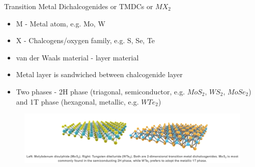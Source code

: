 \documentclass{beamer}
\begin{document}
\begin{frame}{Transition Metal Dichalcogenides or TMDCs or $MX_2$}
\begin{itemize}
    \item M - Metal atom, e.g. Mo, W
    \item X - Chalcogens/oxygen family, e.g. S, Se, Te
    \item van der Waals material - layer material
    \item Metal layer is sandwiched between chalcogenide layer
    \item Two phases - 2H phase (triagonal, semiconductor, e.g. $MoS_2$, $WS_2$, $MoSe_2$) and 1T phase (hexagonal, metallic, e.g. $WTe_2$)
\end{itemize}
\begin{figure}
    \centering
    \includegraphics[scale=0.5]{TMDCs.PNG}
\end{figure}
\end{frame}
\end{document}
